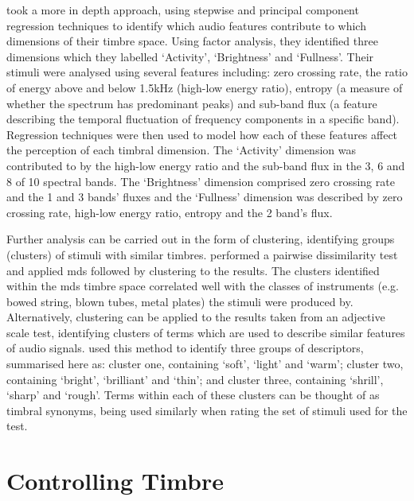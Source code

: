 		\citet{alluri2010exploring} took a more in depth approach, using stepwise and principal component
		regression techniques to identify which audio features contribute to which dimensions of their timbre
		space. Using factor analysis, they identified three dimensions which they labelled `Activity', `Brightness'
		and `Fullness'. Their stimuli were analysed using several features including: zero crossing rate, the ratio
		of energy above and below 1.5kHz (high-low energy ratio), entropy (a measure of whether the spectrum has
		predominant peaks) and sub-band flux (a feature describing the temporal fluctuation of frequency components
		in a specific band). Regression techniques were then used to model how each of these features affect the
		perception of each timbral dimension. The `Activity' dimension was contributed to by the high-low energy
		ratio and the sub-band flux in the 3, 6 and 8 of 10 spectral bands. The
		`Brightness' dimension comprised zero crossing rate and the 1 and 3 bands' fluxes and
		the `Fullness' dimension was described by zero crossing rate, high-low energy ratio, entropy and the
		2 band's flux.

		Further analysis can be carried out in the form of clustering, identifying groups (clusters) of stimuli
		with similar timbres. \citet{lakatos2000a} performed a pairwise dissimilarity test and applied
		\acrshort{mds} followed by clustering to the results. The clusters identified within the \acrshort{mds}
		timbre space correlated well with the classes of instruments (e.g. bowed string, blown tubes, metal plates)
		the stimuli were produced by.  Alternatively, clustering can be applied to the results taken from an
		adjective scale test, identifying clusters of terms which are used to describe similar features of audio
		signals.  \citet{zacharakis2011an2} used this method to identify three groups of descriptors, summarised
		here as: cluster one, containing `soft', `light' and `warm'; cluster two, containing `bright', `brilliant'
		and `thin'; and cluster three, containing `shrill', `sharp' and `rough'. Terms within each of these
		clusters can be thought of as timbral synonyms, being used similarly when rating the set of stimuli used
		for the test.

\section{Controlling Timbre}
\label{sec:Timbre-Control}
